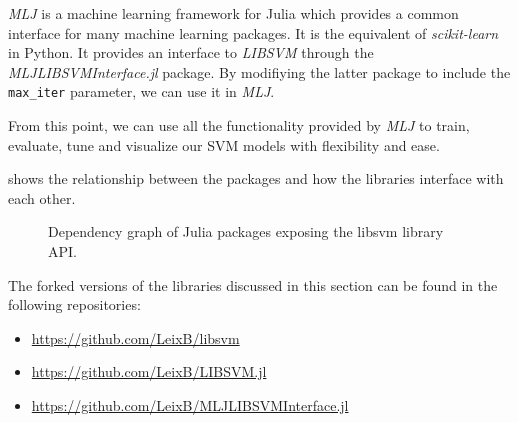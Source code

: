 \emph{MLJ} \cite{blaomMLJJuliaPackage2020} is a machine learning framework for Julia which provides a common interface
for many machine learning packages. It is the equivalent of \emph{scikit-learn} in Python. It provides
an interface to \emph{LIBSVM} through the \emph{MLJLIBSVMInterface.jl} package. By modifiying the latter
package to include the \texttt{max\_iter} parameter, we can use it in \emph{MLJ}.

From this point, we can use all the functionality provided by \emph{MLJ} to train, evaluate,
tune and visualize our SVM models with flexibility and ease.

 shows the relationship between the packages and how the
libraries interface with each other.

\begin{figure}[H]
\caption{Dependency graph of Julia packages exposing the libsvm library API.}
\label{fig:julia_libsvm_deps}
\end{figure}

The forked versions of the libraries discussed in this section can be found in the following
repositories:
\begin{itemize}
    \item \url{https://github.com/LeixB/libsvm}
    \item \url{https://github.com/LeixB/LIBSVM.jl}
    \item \url{https://github.com/LeixB/MLJLIBSVMInterface.jl}
\end{itemize}



